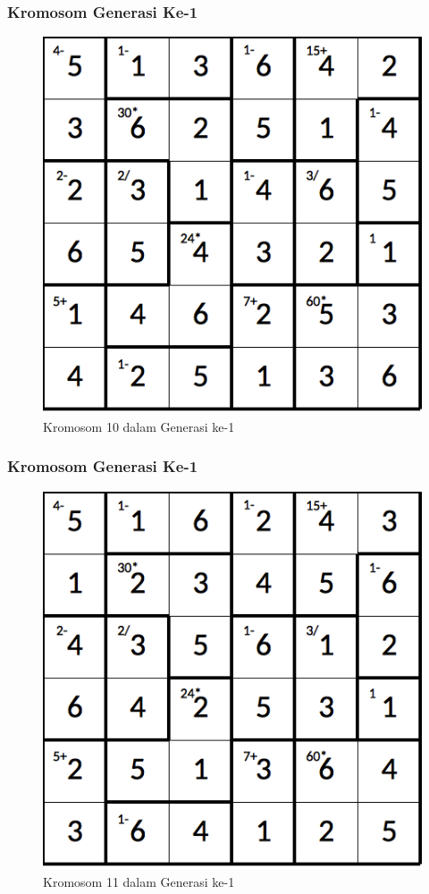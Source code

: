 \documentclass{beamer}
\begin{document}
\begin{frame}
\frametitle{Kromosom Generasi Ke-1}
\begin{figure}
\centering
\captionsetup{justification=centering}
\includegraphics[scale=0.333]{Gambar/hybridgenetic/Generation1Chromosome10}
\caption[Kromosom 10 dalam Generasi ke-1]{Kromosom 10 dalam Generasi ke-1}
\label{fig:analisisg1k10}
\end{figure}
\end{frame}

\note{

}

\begin{frame}
\frametitle{Kromosom Generasi Ke-1}
\begin{figure}
\centering
\captionsetup{justification=centering}
\includegraphics[scale=0.333]{Gambar/hybridgenetic/Generation1Chromosome11}
\caption[Kromosom 11 dalam Generasi ke-1]{Kromosom 11 dalam Generasi ke-1}
\label{fig:analisisg1k11}
\end{figure}
\end{frame}
\end{document}
